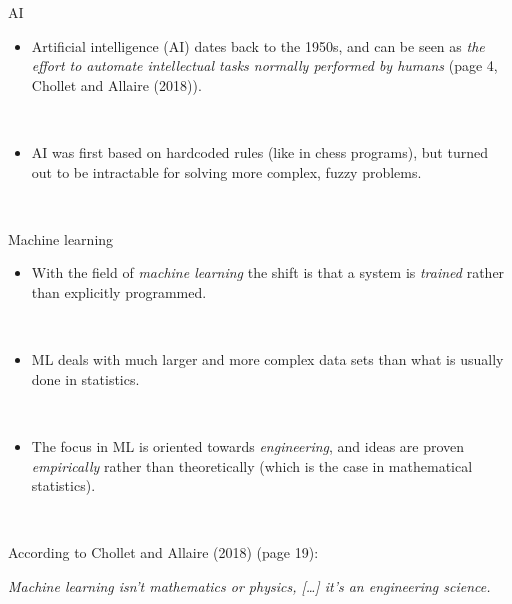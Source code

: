 \documentclass[
  10pt,
  ignorenonframetext,
  twocolumn]{beamer}
\providecommand{\tightlist}{%
  \setlength{\itemsep}{0pt}\setlength{\parskip}{0pt}}
\begin{document}
\begin{frame}
\begin{block}{AI}
\label{ai}
\(~\)

\begin{itemize}
\tightlist
\item
  Artificial intelligence (AI) dates back to the 1950s, and can be seen
  as \emph{the effort to automate intellectual tasks normally performed
  by humans} (page 4, Chollet and Allaire (2018)).
\end{itemize}

\(~\)

\begin{itemize}
\tightlist
\item
  AI was first based on hardcoded rules (like in chess programs), but
  turned out to be intractable for solving more complex, fuzzy problems.
\end{itemize}

\(~\)
\end{block}
\end{frame}

\begin{frame}
\begin{block}{Machine learning}
\label{machine-learning}
\(~\)

\begin{itemize}
\tightlist
\item
  With the field of \emph{machine learning} the shift is that a system
  is \emph{trained} rather than explicitly programmed.
\end{itemize}

\(~\)

\begin{itemize}
\tightlist
\item
  ML deals with much larger and more complex data sets than what is
  usually done in statistics.
\end{itemize}

\(~\)

\begin{itemize}
\tightlist
\item
  The focus in ML is oriented towards \emph{engineering}, and ideas are
  proven \emph{empirically} rather than theoretically (which is the case
  in mathematical statistics).
\end{itemize}

\(~\)

According to Chollet and Allaire (2018) (page 19): \vspace{2mm}

\emph{Machine learning isn't mathematics or physics, {[}\ldots{]} it's
an engineering science.}
\end{block}
\end{frame}
\end{document}
